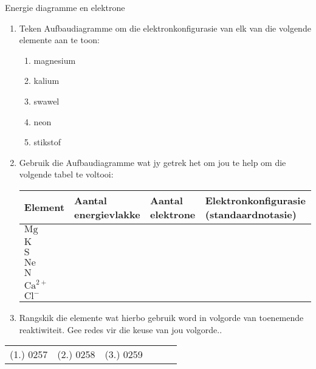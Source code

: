 \begin{exercises}{Energie diagramme en elektrone}
{
\nopagebreak
\begin{enumerate}[noitemsep, label=\textbf{\arabic*}. ] 
\item Teken Aufbaudiagramme om die elektronkonfigurasie van elk van die volgende elemente aan te toon:
\begin{enumerate}[noitemsep, label=\textbf{\alph*}. ] 
\item magnesium
\item kalium
\item swawel
\item neon
\item stikstof
\end{enumerate}
\item Gebruik die Aufbaudiagramme wat jy getrek het om jou te help om die volgende tabel te voltooi:
\begin{center}
\begin{tabular}{|p{1.6cm}|p{2.6cm}|p{2.6cm}|p{2.6cm}|}\hline
\textbf{Element} & \textbf{Aantal energievlakke} & \textbf{Aantal elektrone}  & \textbf{Elektronkonfigurasie (standaardnotasie)}\\\hline
$\text{Mg}$ & &  & \\\hline
$\text{K}$ & &  & \\\hline
$\text{S}$ & & & \\\hline
$\text{Ne}$ &  & & \\\hline
$\text{N}$ & & & \\\hline
$\text{Ca}^{2+}$ & & & \\\hline
$\text{Cl}^{-}$ & & & \\\hline
\end{tabular}
\end{center}    

\item Rangskik die elemente wat hierbo gebruik word in volgorde van toenemende reaktiwiteit. Gee redes vir die keuse van jou volgorde..
\end{enumerate}

\par \practiceinfo
\par \begin{tabular}[h]{cccccc}
(1.)	0257	&
(2.)	0258	&
(3.)	0259	&
\end{tabular}
}
\end{exercises}            

